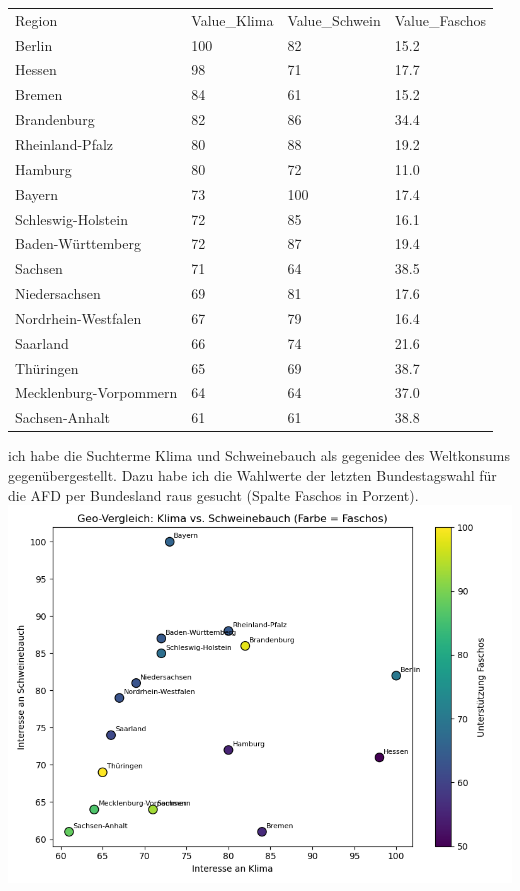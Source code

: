 \documentclass[a4paper,12pt]{scrartcl}
\begin{document}
\begin{table}[h!]
\begin{tabular}{llll}
Region                 & Value\_Klima & Value\_Schwein & Value\_Faschos \\
Berlin                 & 100          & 82             & 15.2           \\
Hessen                 & 98           & 71             & 17.7           \\
Bremen                 & 84           & 61             & 15.2           \\
Brandenburg            & 82           & 86             & 34.4           \\
Rheinland-Pfalz        & 80           & 88             & 19.2           \\
Hamburg                & 80           & 72             & 11.0           \\
Bayern                 & 73           & 100            & 17.4           \\
Schleswig-Holstein     & 72           & 85             & 16.1           \\
Baden-Württemberg      & 72           & 87             & 19.4           \\
Sachsen                & 71           & 64             & 38.5           \\
Niedersachsen          & 69           & 81             & 17.6           \\
Nordrhein-Westfalen    & 67           & 79             & 16.4           \\
Saarland               & 66           & 74             & 21.6           \\
Thüringen              & 65           & 69             & 38.7           \\
Mecklenburg-Vorpommern & 64           & 64             & 37.0           \\
Sachsen-Anhalt         & 61           & 61             & 38.8          
\end{tabular}
\end{table}
ich habe die Suchterme Klima und Schweinebauch als gegenidee des Weltkonsums gegenübergestellt. Dazu habe ich die Wahlwerte der letzten Bundestagswahl für die AFD per Bundesland raus gesucht (Spalte Faschos in Porzent).\\
\includegraphics[scale=0.4]{KliSchwaFaschGEO.png}
\end{document}
